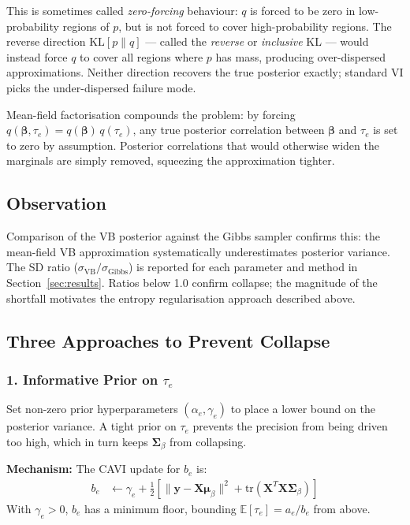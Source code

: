 \documentclass[11pt,a4paper]{article}
\begin{document}
This is sometimes called \emph{zero-forcing} behaviour: $q$ is forced to be zero in low-probability regions of $p$, but is not forced to cover high-probability regions. The reverse direction $\mathrm{KL}[p \| q]$ --- called the \emph{reverse} or \emph{inclusive} KL --- would instead force $q$ to cover all regions where $p$ has mass, producing over-dispersed approximations. Neither direction recovers the true posterior exactly; standard VI picks the under-dispersed failure mode.

Mean-field factorisation compounds the problem: by forcing $q(\bm{\beta}, \tau_e) = q(\bm{\beta})\,q(\tau_e)$, any true posterior correlation between $\bm{\beta}$ and $\tau_e$ is set to zero by assumption. Posterior correlations that would otherwise widen the marginals are simply removed, squeezing the approximation tighter.

\subsection*{Observation}

Comparison of the VB posterior against the Gibbs sampler confirms this: the mean-field VB approximation systematically underestimates posterior variance. The SD ratio ($\sigma_{\mathrm{VB}} / \sigma_{\mathrm{Gibbs}}$) is reported for each parameter and method in Section~\ref{sec:results}. Ratios below 1.0 confirm collapse; the magnitude of the shortfall motivates the entropy regularisation approach described above.

\subsection*{Three Approaches to Prevent Collapse}

\subsubsection*{1. Informative Prior on $\tau_e$}

Set non-zero prior hyperparameters $(\alpha_e, \gamma_e)$ to place a lower bound on the posterior variance. A tight prior on $\tau_e$ prevents the precision from being driven too high, which in turn keeps $\bm{\Sigma}_\beta$ from collapsing.

\textbf{Mechanism:} The CAVI update for $b_e$ is:
\begin{align}
  b_e &\leftarrow \gamma_e + \frac{1}{2}\left[\|\bm{y} - \bm{X}\bm{\mu}_\beta\|^2 + \mathrm{tr}(\bm{X}^T\bm{X}\bm{\Sigma}_\beta)\right]
\end{align}
With $\gamma_e > 0$, $b_e$ has a minimum floor, bounding $\mathbb{E}[\tau_e] = a_e/b_e$ from above.
\end{document}
